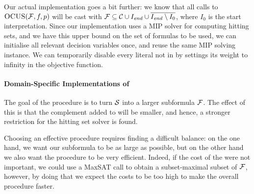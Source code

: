 Our actual implementation goes a bit further: we know that all calls to $\textsc{OCUS}(\mathcal{F} ,f,p)$ will be cast with $\mathcal{F}  \subseteq \mathcal{C}\cup I_\mathit{end}  \cup \overline{I_\mathit{end}  \setminus I_0}$, where $I_0$ is the start interpretation. Since our implementation uses a MIP solver for computing hitting sets, and we have this upper bound on the set of formulas to be used, we can initialise all relevant decision variables once, and reuse the same MIP solving instance. We can temporarily disable every literal not in \formula by settings its weight to infinity in the objective function.




\paragraph{Domain-Specific Implementations of \grow} \label{para:domainspecificgrow}

The goal of the \grow procedure is to turn $\mathcal{S}$ into a larger subformula  $\mathcal{F} $. The effect of this is that the complement added to \setstohit will be smaller, and hence, a stronger restriction for the hitting set solver is found.  

Choosing an effective \grow procedure requires finding a difficult balance: on the one hand, we want our subformula to be as large as possible, %
but on the other hand we also want the procedure to be very efficient. 
Indeed, if the cost of the \grow were not important, we could use a MaxSAT call to obtain a subset-maximal subset of $\mathcal{F} $, however, by doing that we expect the \grow costs to be too high to make the overall procedure faster. 

